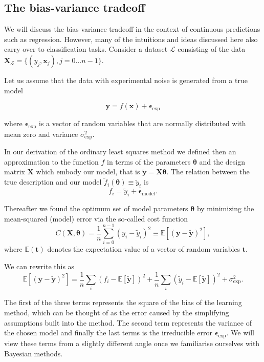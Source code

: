 \documentclass[%
oneside,                 %
final,                   %
10pt]{article}
\begin{document}
\subsection{The bias-variance tradeoff}

We will discuss the bias-variance tradeoff in the context of
continuous predictions such as regression. However, many of the
intuitions and ideas discussed here also carry over to classification
tasks. Consider a dataset $\mathcal{L}$ consisting of the data
$\mathbf{X}_\mathcal{L}=\{(y_j, \boldsymbol{x}_j), j=0\ldots n-1\}$. 

Let us assume that the data with experimental noise is generated from a true model

\[
\bm{y}=f(\boldsymbol{x}) + \bm{\epsilon}_\mathrm{exp}
\]

where $\bm{\epsilon}_\mathrm{exp}$ is a vector of random variables that are normally distributed with mean zero and variance $\sigma^2_\mathrm{exp}$.

In our derivation of the ordinary least squares method we defined then
an approximation to the function $f$ in terms of the parameters
$\bm{\theta}$ and the design matrix $\bm{X}$ which embody our model,
that is $\bm{\tilde{y}}=\bm{X}\bm{\theta}$. The relation between the true description and our model $\tilde{f}_i(\boldsymbol{\theta}) \equiv \tilde{y}_i$ is
\[
f_i = \tilde{y}_i + \bm{\epsilon}_\mathrm{model}.
\]

Thereafter we found the optimum set of model parameters $\bm{\theta}$ by minimizing the mean-squared (model) error via the so-called cost function
\[
C(\bm{X},\bm{\theta}) =\frac{1}{n}\sum_{i=0}^{n-1}(y_i-\tilde{y}_i)^2 \equiv \mathbb{E}\left[(\bm{y}-\bm{\tilde{y}})^2\right],
\]
where $\mathbb{E}(\bm{t})$ denotes the expectation value of a vector of random variables $\bm{t}$.

We can rewrite this as 
\[
\mathbb{E}\left[(\bm{y}-\bm{\tilde{y}})^2\right]=\frac{1}{n}\sum_i(f_i-\mathbb{E}\left[\bm{\tilde{y}}\right])^2+\frac{1}{n}\sum_i(\tilde{y}_i-\mathbb{E}\left[\bm{\tilde{y}}\right])^2+\sigma^2_\mathrm{exp}.
\]

The first of the three terms represents the square of the bias of the learning
method, which can be thought of as the error caused by the simplifying
assumptions built into the method. The second term represents the
variance of the chosen model and finally the last terms is the irreducible error $\bm{\epsilon}_\mathrm{exp}$. We will view these terms from a slightly different angle once we familiarise ourselves with Bayesian methods.
\end{document}

